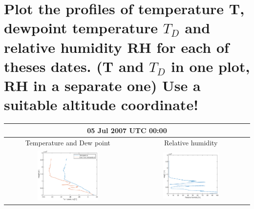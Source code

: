 \documentclass{article}
\begin{document}
\newpage
\section{Plot the profiles of temperature T, dewpoint temperature $T_D$ and relative humidity RH for each of theses dates. (T and $T_D$ in one plot, RH in a separate one) Use a suitable altitude coordinate!}

\begin{tabular}{c c}
\multicolumn{2}{c}{\textbf{05 Jul 2007 UTC 00:00}}\\ \hline
Temperature and Dew point & Relative humidity \\ \hline
\includegraphics[width=0.5\textwidth]{figures/3plot1a.eps} & \includegraphics[width=0.5\textwidth]{figures/3plot1b.eps} 

\end{tabular}
\end{document}
